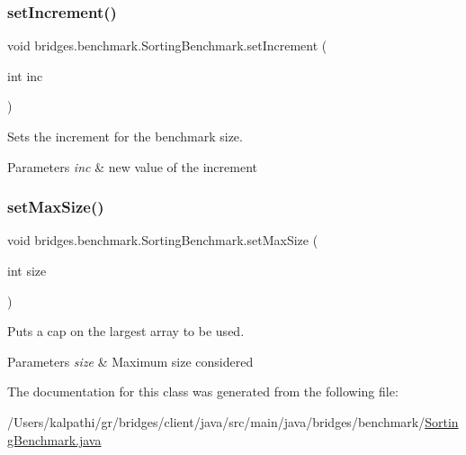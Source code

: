 \subsubsection{\texorpdfstring{set\+Increment()}{setIncrement()}}
{\footnotesize\ttfamily void bridges.\+benchmark.\+Sorting\+Benchmark.\+set\+Increment (\begin{DoxyParamCaption}\item[{int}]{inc }\end{DoxyParamCaption})}



Sets the increment for the benchmark size. 


\begin{DoxyParams}{Parameters}
{\em inc} & new value of the increment \\
\hline
\end{DoxyParams}
\mbox{\label{classbridges_1_1benchmark_1_1_sorting_benchmark_a62db485e1a96afce2eed758e6e65555c}} 
\subsubsection{\texorpdfstring{set\+Max\+Size()}{setMaxSize()}}
{\footnotesize\ttfamily void bridges.\+benchmark.\+Sorting\+Benchmark.\+set\+Max\+Size (\begin{DoxyParamCaption}\item[{int}]{size }\end{DoxyParamCaption})}



Puts a cap on the largest array to be used. 


\begin{DoxyParams}{Parameters}
{\em size} & Maximum size considered \\
\hline
\end{DoxyParams}


The documentation for this class was generated from the following file\+:\begin{DoxyCompactItemize}
\item 
/\+Users/kalpathi/gr/bridges/client/java/src/main/java/bridges/benchmark/\mbox{\hyperlink{_sorting_benchmark_8java}{Sorting\+Benchmark.\+java}}\end{DoxyCompactItemize}
